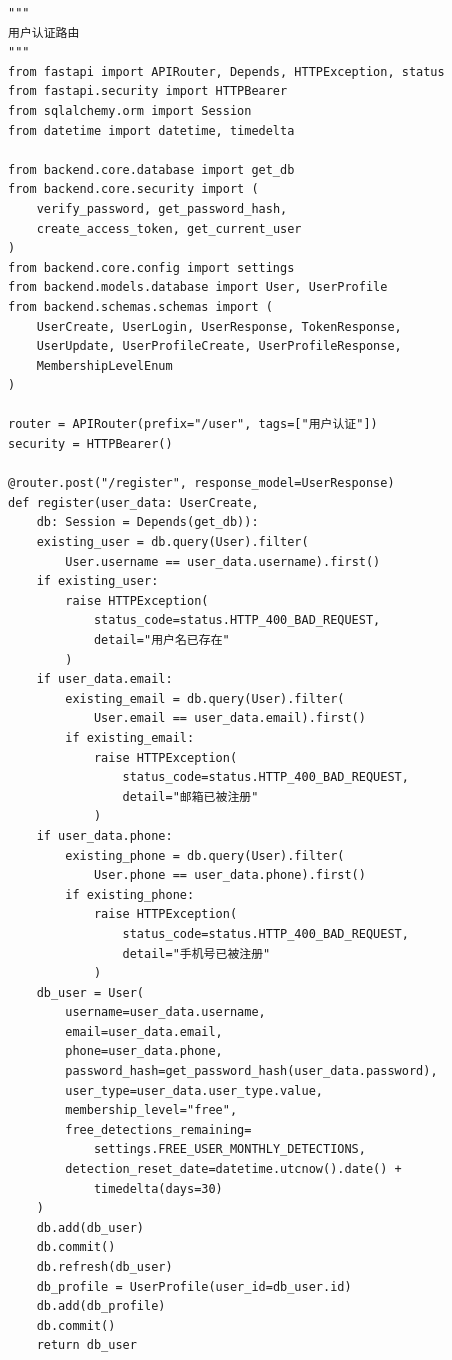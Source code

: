 \documentclass[a4paper,10pt]{article}
\begin{document}
\begin{lstlisting}
"""
用户认证路由
"""
from fastapi import APIRouter, Depends, HTTPException, status
from fastapi.security import HTTPBearer
from sqlalchemy.orm import Session
from datetime import datetime, timedelta

from backend.core.database import get_db
from backend.core.security import (
    verify_password, get_password_hash,
    create_access_token, get_current_user
)
from backend.core.config import settings
from backend.models.database import User, UserProfile
from backend.schemas.schemas import (
    UserCreate, UserLogin, UserResponse, TokenResponse,
    UserUpdate, UserProfileCreate, UserProfileResponse,
    MembershipLevelEnum
)

router = APIRouter(prefix="/user", tags=["用户认证"])
security = HTTPBearer()

@router.post("/register", response_model=UserResponse)
def register(user_data: UserCreate,
    db: Session = Depends(get_db)):
    existing_user = db.query(User).filter(
        User.username == user_data.username).first()
    if existing_user:
        raise HTTPException(
            status_code=status.HTTP_400_BAD_REQUEST,
            detail="用户名已存在"
        )
    if user_data.email:
        existing_email = db.query(User).filter(
            User.email == user_data.email).first()
        if existing_email:
            raise HTTPException(
                status_code=status.HTTP_400_BAD_REQUEST,
                detail="邮箱已被注册"
            )
    if user_data.phone:
        existing_phone = db.query(User).filter(
            User.phone == user_data.phone).first()
        if existing_phone:
            raise HTTPException(
                status_code=status.HTTP_400_BAD_REQUEST,
                detail="手机号已被注册"
            )
    db_user = User(
        username=user_data.username,
        email=user_data.email,
        phone=user_data.phone,
        password_hash=get_password_hash(user_data.password),
        user_type=user_data.user_type.value,
        membership_level="free",
        free_detections_remaining=
            settings.FREE_USER_MONTHLY_DETECTIONS,
        detection_reset_date=datetime.utcnow().date() +
            timedelta(days=30)
    )
    db.add(db_user)
    db.commit()
    db.refresh(db_user)
    db_profile = UserProfile(user_id=db_user.id)
    db.add(db_profile)
    db.commit()
    return db_user


\end{lstlisting}
\end{document}

